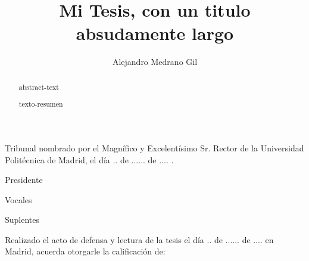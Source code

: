 \documentclass[12pt,twoside,titlepage,capitalize,draft]{upm-thesis}
\author{Alejandro Medrano Gil \degreeIn{Ingeniero en Informatica}}
\title{Mi Tesis, con un titulo absudamente largo}
\begin{document}
\maketitle

\begin{titlepage}
\begin{flushleft}
Tribunal nombrado por el Magnífico y Excelentísimo Sr. Rector de la Universidad
Politécnica de Madrid, el día .. de ...... de .... .
\end{flushleft}

\begin{TribunalRole}{Presidente}
\end{TribunalRole}
\begin{TribunalRole}{Vocales}
\end{TribunalRole}
\begin{TribunalRole}{Suplentes}
\end{TribunalRole}

\begin{flushleft}
Realizado el acto de defensa y lectura de la tesis el día .. de ...... de .... en Madrid,
acuerda otorgarle la calificación de:
\end{flushleft}

\end{titlepage}
\BlankTitlePage

\frontmatter
\begin{otherlanguage}{english}
\begin{abstract}
   abstract-text
\end{abstract}
\end{otherlanguage}
\begin{otherlanguage}{spanish}
\begin{abstract}
   texto-resumen
\end{abstract}
\end{otherlanguage}

\end{document}
